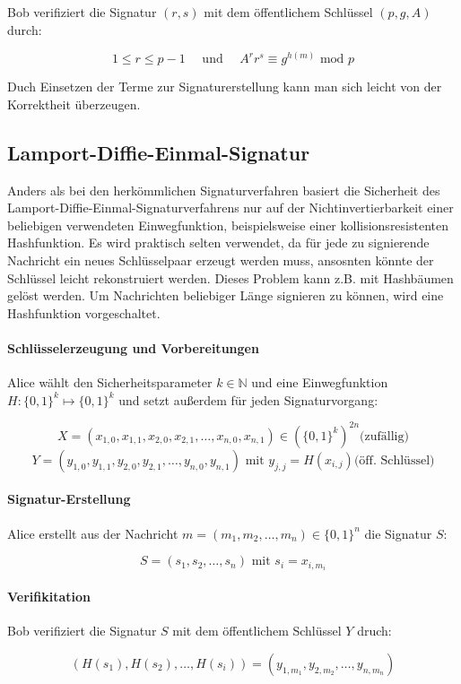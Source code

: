 \documentclass[a4paper,12pt,oneside]{scrreprt}
\begin{document}
Bob verifiziert die Signatur $(r,s)$ mit dem öffentlichem Schlüssel $(p, g, A)$ durch:

\[ 1 \leq r \leq p-1 \text{~~~~und~~~~} A^r r^s \equiv g^{h(m)} \text{ mod } p\]

Duch Einsetzen der Terme zur Signaturerstellung kann man sich leicht von der Korrektheit
überzeugen. 

\subsection*{Lamport-Diffie-Einmal-Signatur}

Anders als bei den herkömmlichen Signaturverfahren basiert die Sicherheit des Lamport-Diffie-Einmal-Signaturverfahrens
nur auf der Nichtinvertierbarkeit einer beliebigen verwendeten Einwegfunktion, beispielsweise einer kollisionsresistenten Hashfunktion. 
Es wird praktisch selten verwendet, da für jede zu signierende Nachricht ein neues Schlüsselpaar erzeugt werden muss, 
ansosnten könnte der Schlüssel leicht rekonstruiert werden. Dieses Problem kann z.B. mit Hashbäumen gelöst werden. 
Um Nachrichten beliebiger Länge signieren zu können, wird eine Hashfunktion vorgeschaltet. 

\paragraph{Schlüsselerzeugung und Vorbereitungen}

Alice wählt den Sicherheitsparameter $k \in \mathbb{N}$ und eine Einwegfunktion 
$H : \{0,1\}^k \mapsto \{0,1\}^k$ und setzt außerdem für jeden Signaturvorgang:

\[ X = (x_{1,0},x_{1,1},x_{2,0},x_{2,1},\dots,x_{n,0},x_{n,1}) \in (\{0,1\}^k)^{2n} \text{(zufällig)}\]
\[ Y = (y_{1,0},y_{1,1},y_{2,0},y_{2,1},\dots,y_{n,0},y_{n,1}) \text{ mit } y_{j,j} = H(x_{i,j}) \text{(öff. Schlüssel)}\]

\paragraph{Signatur-Erstellung}

Alice erstellt aus der Nachricht $m = (m_1, m_2, \dots, m_n) \in \{0,1\}^n$ die Signatur $S$:

\[ S = (s_1, s_2, \dots, s_n) \text{ mit } s_i = x_{i,m_i}\]

\paragraph{Verifikitation}

Bob verifiziert die Signatur $S$ mit dem öffentlichem Schlüssel $Y$ druch:

\[ (H(s_1),H(s_2),\dots,H(s_i)) = (y_{1,m_1},y_{2,m_2},\dots,y_{n,m_n})\]
\end{document}
